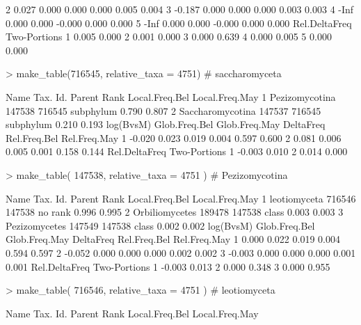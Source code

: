 \documentclass{article}
\begin{document}
\begin{Schunk}
\begin{Soutput}
2     0.027         0.000         0.000     0.000        0.005        0.004
3    -0.187         0.000         0.000     0.000        0.003        0.003
4      -Inf         0.000         0.000    -0.000        0.000        0.000
5      -Inf         0.000         0.000    -0.000        0.000        0.000
  Rel.DeltaFreq Two-Portions
1         0.005        0.000
2         0.001        0.000
3         0.000        0.639
4         0.000        0.005
5         0.000        0.000
\end{Soutput}
\begin{Sinput}
> make_table(716545, relative_taxa = 4751) # saccharomyceta
\end{Sinput}
\begin{Soutput}
              Name Tax. Id. Parent      Rank Local.Freq.Bel Local.Freq.May
1   Pezizomycotina   147538 716545 subphylum          0.790          0.807
2 Saccharomycotina   147537 716545 subphylum          0.210          0.193
  log(BvsM) Glob.Freq.Bel Glob.Freq.May DeltaFreq Rel.Freq.Bel Rel.Freq.May
1    -0.020         0.023         0.019     0.004        0.597        0.600
2     0.081         0.006         0.005     0.001        0.158        0.144
  Rel.DeltaFreq Two-Portions
1        -0.003        0.010
2         0.014        0.000
\end{Soutput}
\begin{Sinput}
> make_table( 147538, relative_taxa = 4751 ) # Pezizomycotina
\end{Sinput}
\begin{Soutput}
            Name Tax. Id. Parent    Rank Local.Freq.Bel Local.Freq.May
1   leotiomyceta   716546 147538 no rank          0.996          0.995
2 Orbiliomycetes   189478 147538   class          0.003          0.003
3  Pezizomycetes   147549 147538   class          0.002          0.002
  log(BvsM) Glob.Freq.Bel Glob.Freq.May DeltaFreq Rel.Freq.Bel Rel.Freq.May
1     0.000         0.022         0.019     0.004        0.594        0.597
2    -0.052         0.000         0.000     0.000        0.002        0.002
3    -0.003         0.000         0.000     0.000        0.001        0.001
  Rel.DeltaFreq Two-Portions
1        -0.003        0.013
2         0.000        0.348
3         0.000        0.955
\end{Soutput}
\begin{Sinput}
> make_table( 716546, relative_taxa = 4751 ) # leotiomyceta
\end{Sinput}
\begin{Soutput}
             Name Tax. Id. Parent    Rank Local.Freq.Bel Local.Freq.May

\end{Soutput}
\end{Schunk}
\end{document}

